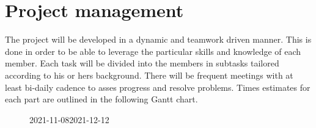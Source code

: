 \documentclass[fleqn,10pt]{SelfArx} %
\begin{document}
\section{Project management}
The project will be developed in a dynamic and teamwork driven manner.
This is done in order to be able to leverage the particular skills and knowledge of each member.
Each task will be divided into the members in subtasks tailored according to his or hers background.
There will be frequent meetings with at least bi-daily cadence to asses progress and resolve problems.
Times estimates for each part are outlined in the following Gantt chart.
\begin{figure}[ht]
	\label{gantt}

	\begin{ganttchart}[
		vgrid,
		title label font = \tiny,
		inline,
		time slot format=isodate,
		x unit=2mm,
		canvas/.style= { fill = green!25, draw =green!50, thick},
		bar/.append style={fill=red!50},
		title/.style={fill=yellow!50}
		]{2021-11-08}{2021-12-12}
		 \\
	\\
	\\
	\\
	\\
	\\
	\\
	\\
	\\
	\end{ganttchart}
\end{figure}




\end{document}
